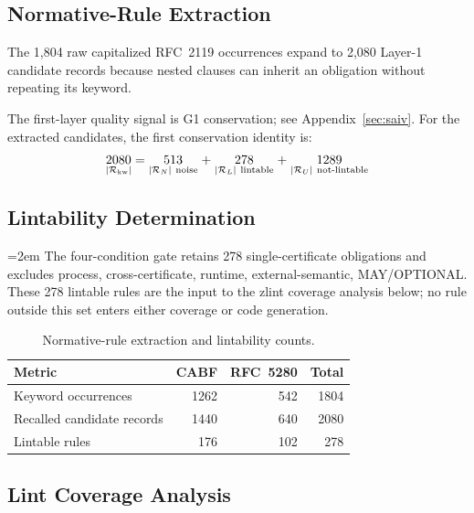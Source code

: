 \subsection{Normative-Rule Extraction}
\label{subsec:rule-extraction}

The 1,804 raw capitalized RFC~2119 occurrences expand to 2,080 Layer-1
candidate records because nested clauses can inherit an obligation without
repeating its keyword.

The first-layer quality signal is G1 conservation; see Appendix~\ref{sec:saiv}. For the extracted candidates, the first conservation
identity is:
\[
\begin{array}{c @{\;} c @{\;} c @{\;} c @{\;} c @{\;} c @{\;} c}
  \underset{|\Rkw|}{2080} & = & \underset{|\RN|\ \text{noise}}{513} & + & \underset{|\RL|\ \text{lintable}}{278} & + & \underset{|\RU|\ \text{not-lintable}}{1289}
\end{array}
\]

\subsection{Lintability Determination}
\label{subsec:lintability-eval}

\begingroup\emergencystretch=2em\relax
The four-condition gate retains 278 single-certificate obligations and excludes
process, cross-certificate, runtime, external-semantic, MAY/OPTIONAL. These 278 lintable rules are the input to the zlint coverage
analysis below; no rule outside this set enters either coverage or code generation.
\par\endgroup


\begin{table}[!htbp]
\centering
\small
\setlength{\tabcolsep}{3pt}
\caption{Normative-rule extraction and lintability counts.}
\label{tab:rule-recall}
\begin{tabularx}{\columnwidth}{@{}X r r r@{}}
\toprule
Metric & CABF & RFC~5280 & Total \\
\midrule
Keyword occurrences & 1262 & 542 & 1804 \\
Recalled candidate records & 1440 & 640 & 2080 \\
Lintable rules & 176 & 102 & 278 \\
\bottomrule
\end{tabularx}
\end{table}

\subsection{Lint Coverage Analysis}
\label{subsec:coverage}

